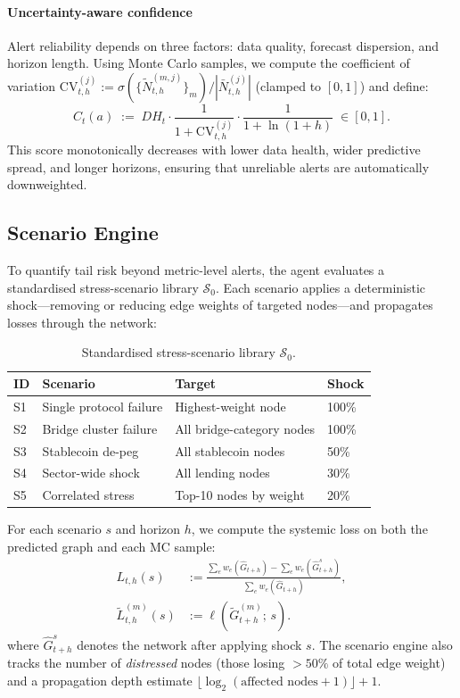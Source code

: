 \paragraph{Uncertainty-aware confidence}
Alert reliability depends on three factors: data quality, forecast dispersion, and horizon length. Using Monte Carlo samples, we compute the coefficient of variation $\mathrm{CV}_{t,h}^{(j)} := \sigma(\{\widetilde{N}^{(m,j)}_{t,h}\}_m) / |\bar{N}^{(j)}_{t,h}|$ (clamped to $[0,1]$) and define:
\begin{equation}
\label{eq:alert_confidence}
C_t(a)\;:=\; DH_t \cdot \frac{1}{1+\mathrm{CV}_{t,h}^{(j)}} \cdot \frac{1}{1+\ln(1+h)}\;\in[0,1].
\end{equation}
This score monotonically decreases with lower data health, wider predictive spread, and longer horizons, ensuring that unreliable alerts are automatically downweighted.

\subsection{Scenario Engine}
\label{subsec:scenario_engine}
To quantify tail risk beyond metric-level alerts, the agent evaluates a standardised stress-scenario library $\mathcal{S}_0$. Each scenario applies a deterministic shock---removing or reducing edge weights of targeted nodes---and propagates losses through the network:

\begin{table}[!t]
\centering
\footnotesize
\setlength{\tabcolsep}{4pt}
\begin{tabular}{llll}
\toprule
ID & Scenario & Target & Shock \\
\midrule
S1 & Single protocol failure & Highest-weight node & 100\% \\
S2 & Bridge cluster failure & All bridge-category nodes & 100\% \\
S3 & Stablecoin de-peg & All stablecoin nodes & 50\% \\
S4 & Sector-wide shock & All lending nodes & 30\% \\
S5 & Correlated stress & Top-10 nodes by weight & 20\% \\
\bottomrule
\end{tabular}
\caption{Standardised stress-scenario library $\mathcal{S}_0$.}
\label{tab:scenarios}
\end{table}

\noindent For each scenario $s$ and horizon $h$, we compute the systemic loss on both the predicted graph and each MC sample:
\begin{align}
\label{eq:scenario_loss}
L_{t,h}(s)
&:= \frac{\sum_e w_e(\widehat{G}_{t+h}) - \sum_e w_e(\widehat{G}_{t+h}^s)}
{\sum_e w_e(\widehat{G}_{t+h})},
\\
\widetilde{L}^{(m)}_{t,h}(s)
&:= \ell\!\left(\widetilde{G}^{(m)}_{t+h};\, s\right).
\end{align}
where $\widehat{G}_{t+h}^s$ denotes the network after applying shock $s$. The scenario engine also tracks the number of \emph{distressed} nodes (those losing $>50\%$ of total edge weight) and a propagation depth estimate $\lfloor\log_2(\text{affected nodes}+1)\rfloor + 1$.

